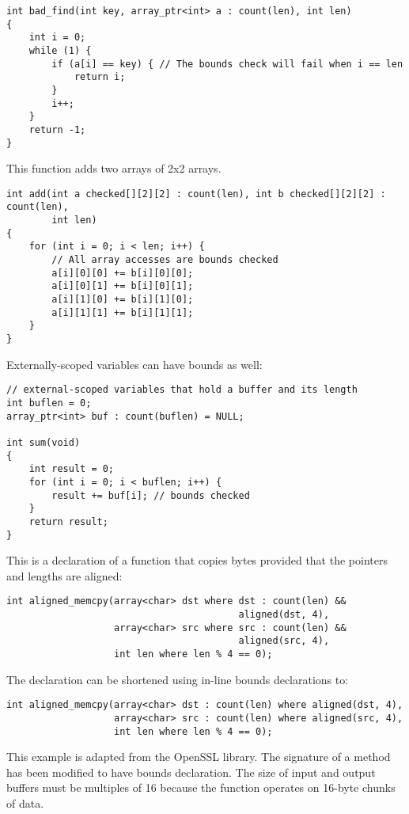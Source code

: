 \begin{lstlisting}
int bad_find(int key, array_ptr<int> a : count(len), int len)
{
    int i = 0;
    while (1) {
        if (a[i] == key) { // The bounds check will fail when i == len
            return i;
        }
        i++;
    }
    return -1;
}

\end{lstlisting}

This function adds two arrays of 2x2 arrays.

\begin{lstlisting}
int add(int a checked[][2][2] : count(len), int b checked[][2][2] : count(len), 
        int len) 
{
    for (int i = 0; i < len; i++) {
        // All array accesses are bounds checked
        a[i][0][0] += b[i][0][0]; 
        a[i][0][1] += b[i][0][1];
        a[i][1][0] += b[i][1][0];
        a[i][1][1] += b[i][1][1];
    }
}
\end{lstlisting}

Externally-scoped variables can have bounds as well:

\begin{lstlisting}
// external-scoped variables that hold a buffer and its length
int buflen = 0;
array_ptr<int> buf : count(buflen) = NULL;

int sum(void)
{
    int result = 0;
    for (int i = 0; i < buflen; i++) {
        result += buf[i]; // bounds checked
    }
    return result;
}
\end{lstlisting}

This is a declaration of a function that copies bytes provided that the
pointers and lengths are aligned:
\begin{lstlisting}
int aligned_memcpy(array<char> dst where dst : count(len) && 
                                         aligned(dst, 4),
                   array<char> src where src : count(len) && 
                                         aligned(src, 4),
                   int len where len % 4 == 0);
\end{lstlisting}

The declaration can be shortened using in-line bounds declarations to:

\begin{lstlisting}
int aligned_memcpy(array<char> dst : count(len) where aligned(dst, 4),
                   array<char> src : count(len) where aligned(src, 4),
                   int len where len % 4 == 0);
\end{lstlisting}

This example is adapted from the OpenSSL library. The signature of a
method has been modified to have bounds declaration. The size of input
and output buffers must be multiples of 16 because the function operates
on 16-byte chunks of data.

